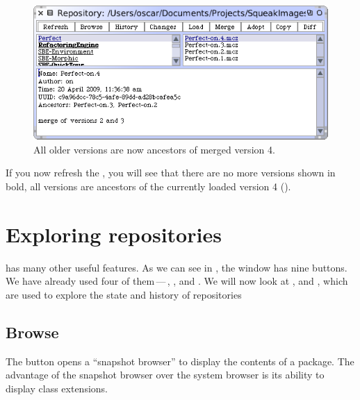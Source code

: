 \documentclass[a4paper,10pt,twoside]{book}
\begin{document}

\begin{figure}[ht]\centering
	\includegraphics[width=.8\textwidth]{merged}
	\caption{All older versions are now ancestors of merged version 4.
	}
\end{figure}

If you now refresh the \RI, you will see that there are no more versions shown in bold, \ie all versions are ancestors of the currently loaded version 4 ().

\section{Exploring \MC repositories}

\MC has many other useful features. As we can see in , the \MCB window has nine buttons. We have already used four of them\,---\,, ,  and .
We will now look at ,  and , which are used to explore the state and history of repositories


\subsection{Browse}

The  button opens a ``snapshot browser'' to display the contents of a package.
The advantage of the snapshot browser over the system browser is its ability to display class extensions.
\end{document}
